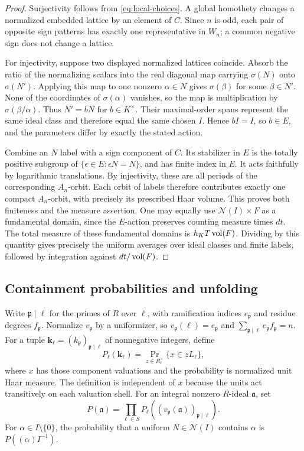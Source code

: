 \begin{proof}
Surjectivity follows from \eqref{eq:local-choices}. A global
homothety changes a normalized embedded lattice by an element
of $C$. Since $n$ is odd, each pair of opposite sign patterns has
exactly one representative in $W_n$; a common negative sign
does not change a lattice.

For injectivity, suppose two displayed normalized lattices coincide.
Absorb the ratio of the normalizing scalars into the real diagonal
map carrying $\sigma(N)$ onto $\sigma(N')$. Applying this map
to one nonzero $\alpha\in N$ gives $\sigma(\beta)$ for some
$\beta\in N'$. None of the coordinates of $\sigma(\alpha)$
vanishes, so the map is multiplication by $\sigma(\beta/\alpha)$.
Thus $N'=bN$ for $b\in K^\times$. Their maximal-order spans
represent the same ideal class and therefore equal the same
chosen $I$. Hence $bI=I$, so $b\in E$, and the parameters differ
by exactly the stated action.

Combine an $N$ label with a sign component of $C$. Its stabilizer in $E$
is the totally positive subgroup of
$\{\epsilon\in E:\epsilon N=N\}$, and has finite index in $E$.
It acts faithfully by logarithmic translations. By injectivity,
these are all periods of the corresponding $A_n$-orbit.
Each orbit of labels therefore contributes exactly one compact
$A_n$-orbit, with precisely its prescribed Haar volume.
This proves both finiteness and the measure assertion.
One may equally use $\mathcal N(I)\times F$ as a fundamental
domain, since the $E$-action preserves counting measure times $dt$.
The total measure of these fundamental domains is
$h_KT\operatorname{vol}(F)$. Dividing by this quantity gives precisely the
uniform averages over ideal classes and finite labels, followed
by integration against $dt/\operatorname{vol}(F)$.
\end{proof}

\subsection{Containment probabilities and unfolding}

Write $\mathfrak p\mid\ell$ for the primes of $R$ over $\ell$,
with ramification indices $e_{\mathfrak p}$ and residue degrees
$f_{\mathfrak p}$. Normalize $v_{\mathfrak p}$ by a uniformizer,
so $v_{\mathfrak p}(\ell)=e_{\mathfrak p}$ and
$\sum_{\mathfrak p\mid\ell}e_{\mathfrak p}f_{\mathfrak p}=n$.
For a tuple $\mathbf k_\ell=(k_{\mathfrak p})_{\mathfrak p\mid\ell}$
of nonnegative integers, define
\[
 P_\ell(\mathbf k_\ell)
 =\Pr_{z\in R_\ell^\times}\{x\in zL_\ell\},
\]
where $x$ has those component valuations and the probability is
normalized unit Haar measure. The definition is independent of $x$
because the units act transitively on each valuation shell.
For an integral nonzero $R$-ideal $\mathfrak a$, set
\[
 P(\mathfrak a)=\prod_{\ell\in S}
       P_\ell((v_{\mathfrak p}(\mathfrak a))_{\mathfrak p\mid\ell}).
\]
For $\alpha\in I\setminus\{0\}$, the probability that a uniform
$N\in\mathcal N(I)$ contains $\alpha$ is
$P((\alpha)I^{-1})$.

